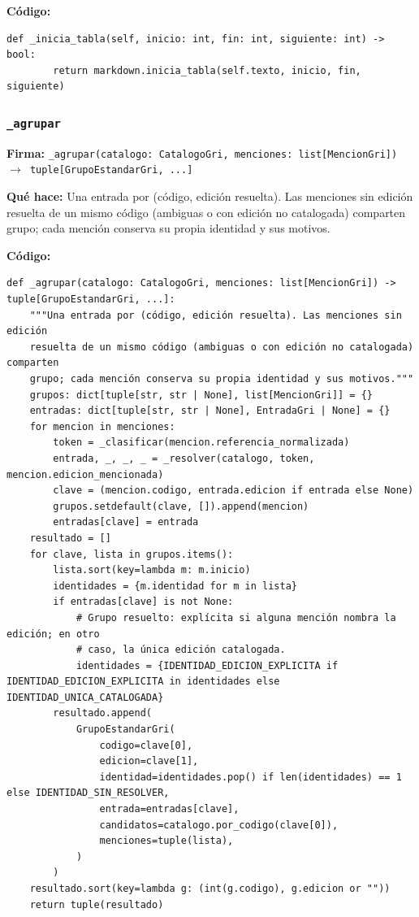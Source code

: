 \documentclass[11pt,a4paper]{article}
\begin{document}
\textbf{Código:}
\begin{lstlisting}
def _inicia_tabla(self, inicio: int, fin: int, siguiente: int) -> bool:
        return markdown.inicia_tabla(self.texto, inicio, fin, siguiente)
\end{lstlisting}

\subsubsection*{\texttt{\_agrupar}}
\textbf{Firma:} \texttt{\_agrupar(catalogo: CatalogoGri, menciones: list[MencionGri]) $\rightarrow$ tuple[GrupoEstandarGri, ...]}

\textbf{Qué hace:} Una entrada por (código, edición resuelta). Las menciones sin edición
resuelta de un mismo código (ambiguas o con edición no catalogada) comparten
grupo; cada mención conserva su propia identidad y sus motivos.

\textbf{Código:}
\begin{lstlisting}
def _agrupar(catalogo: CatalogoGri, menciones: list[MencionGri]) -> tuple[GrupoEstandarGri, ...]:
    """Una entrada por (código, edición resuelta). Las menciones sin edición
    resuelta de un mismo código (ambiguas o con edición no catalogada) comparten
    grupo; cada mención conserva su propia identidad y sus motivos."""
    grupos: dict[tuple[str, str | None], list[MencionGri]] = {}
    entradas: dict[tuple[str, str | None], EntradaGri | None] = {}
    for mencion in menciones:
        token = _clasificar(mencion.referencia_normalizada)
        entrada, _, _, _ = _resolver(catalogo, token, mencion.edicion_mencionada)
        clave = (mencion.codigo, entrada.edicion if entrada else None)
        grupos.setdefault(clave, []).append(mencion)
        entradas[clave] = entrada
    resultado = []
    for clave, lista in grupos.items():
        lista.sort(key=lambda m: m.inicio)
        identidades = {m.identidad for m in lista}
        if entradas[clave] is not None:
            # Grupo resuelto: explícita si alguna mención nombra la edición; en otro
            # caso, la única edición catalogada.
            identidades = {IDENTIDAD_EDICION_EXPLICITA if IDENTIDAD_EDICION_EXPLICITA in identidades else IDENTIDAD_UNICA_CATALOGADA}
        resultado.append(
            GrupoEstandarGri(
                codigo=clave[0],
                edicion=clave[1],
                identidad=identidades.pop() if len(identidades) == 1 else IDENTIDAD_SIN_RESOLVER,
                entrada=entradas[clave],
                candidatos=catalogo.por_codigo(clave[0]),
                menciones=tuple(lista),
            )
        )
    resultado.sort(key=lambda g: (int(g.codigo), g.edicion or ""))
    return tuple(resultado)
\end{lstlisting}
\end{document}

